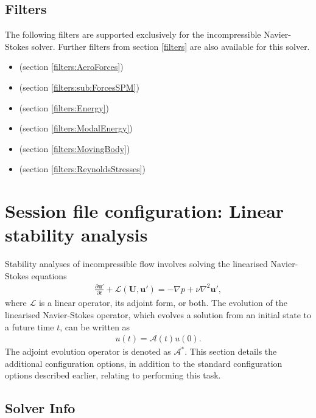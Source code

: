 \subsection{Filters}
The following filters are supported exclusively for the incompressible
Navier-Stokes solver. Further filters from section \ref{filters} are also
available for this solver.

\begin{itemize}
  \item {} (section \ref{filters:AeroForces})
  \item {} (section \ref{filters:sub:ForcesSPM})
  \item {} (section \ref{filters:Energy})
  \item {} (section \ref{filters:ModalEnergy})
  \item {} (section \ref{filters:MovingBody})
  \item {} (section \ref{filters:ReynoldsStresses})
\end{itemize}

\section{Session file configuration: Linear stability analysis}
\label{SecStabFile}
Stability analyses of incompressible flow involves solving the linearised Navier-Stokes equations
\begin{align*}
    \frac{\partial\mathbf{u'}}{\partial t} +\mathcal{L}(\mathbf{U},\mathbf{u'})=-\nabla p+\nu \nabla^2 \mathbf{u'},
\end{align*}
where $\mathcal{L}$ is a linear operator, its adjoint form, or both. The evolution of the linearised Navier-Stokes operator, which evolves a solution from an initial state to a future time $t$, can be written as
\begin{align*}
u(t) = \mathcal{A}(t)u(0).
\end{align*}
The adjoint evolution operator is denoted as $\mathcal{A}^*$.
This section details the additional configuration options, in addition to the standard configuration options described earlier, relating to performing this task.

\subsection{Solver Info}
\label{SectionIncNS_SolverInfo_Stab}

